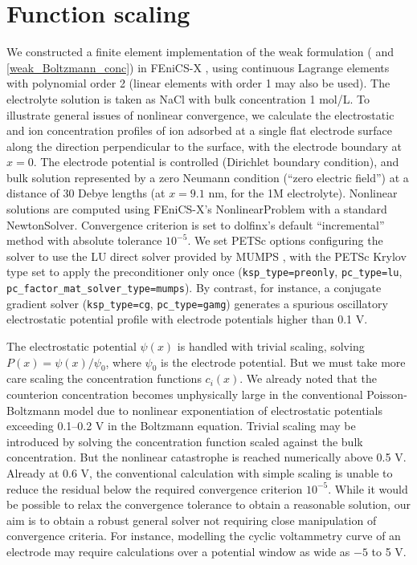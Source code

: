 \section{Function scaling}
We constructed a finite element implementation of the weak
formulation ( and \eqref{weak_Boltzmann_conc}) in
FEniCS-X \cite{baratta2023dolfinx}, using continuous 
Lagrange elements with polynomial order 2 (linear elements with order
1 may also be used).  The electrolyte solution
is taken as NaCl with bulk concentration 1 mol/L.  To illustrate
general issues of nonlinear convergence, we calculate the
electrostatic and ion concentration profiles of ion adsorbed at a
single flat electrode surface along the direction perpendicular to the
surface, with the electrode boundary at $x=0$.  The electrode
potential is controlled (Dirichlet boundary condition), and bulk
solution represented by a zero Neumann condition (``zero electric
field'') at  a distance of 30 Debye lengths (at $x=9.1$ nm, for the 1M
electrolyte). Nonlinear solutions are computed using FEniCS-X's
NonlinearProblem with a standard NewtonSolver. Convergence criterion
is set to dolfinx's default ``incremental'' method with absolute
tolerance $10^{-5}$.
We set PETSc options \cite{PETSc_manual,petsc4py_2011} configuring the solver to use the LU direct
solver provided by MUMPS \cite{MUMPS_2001,MUMPS_2019}, with the PETSc Krylov type set to apply the
preconditioner only once (\verb|ksp_type=preonly|, \verb|pc_type=lu|,  \verb|pc_factor_mat_solver_type=mumps|).
By contrast, for instance, a
conjugate gradient solver (\verb|ksp_type=cg|, \verb|pc_type=gamg|)
generates a spurious oscillatory electrostatic potential profile with electrode
potentials higher than 0.1 V.

The electrostatic potential $\psi(x)$ is handled with trivial
scaling, solving $P(x)=\psi(x)/\psi_0$, where $\psi_0$ is the
electrode potential.
But we must take more care scaling the concentration functions
$c_i(x)$.
We already noted that the counterion concentration becomes unphysically
large in the conventional Poisson-Boltzmann model due to nonlinear
exponentiation of  electrostatic potentials exceeding 0.1--0.2 V in
the Boltzmann equation. Trivial scaling may be introduced by solving
the concentration function scaled against the bulk concentration. But
 the nonlinear catastrophe is reached
numerically above 0.5 V. Already at 0.6 V, the conventional
calculation with simple scaling is unable to reduce the residual below
the required convergence criterion  $10^{-5}$. While it would be possible to relax the
convergence tolerance to obtain a reasonable solution, our aim is to
obtain a robust general solver not requiring close manipulation of
convergence criteria. For instance,  modelling the
cyclic voltammetry curve of an electrode may require calculations
over a potential window as wide as $-5$ to 5 V.

